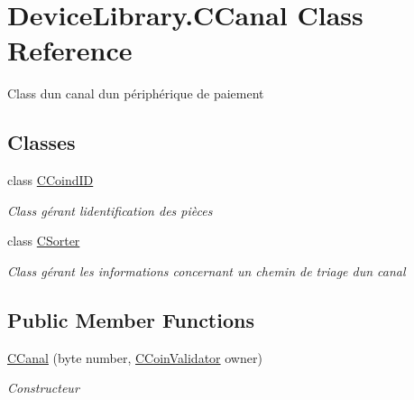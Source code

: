 \hypertarget{class_device_library_1_1_c_canal}{}\section{Device\+Library.\+C\+Canal Class Reference}
\label{class_device_library_1_1_c_canal}


Class d\textquotesingle{}un canal d\textquotesingle{}un périphérique de paiement  


\subsection*{Classes}
\begin{DoxyCompactItemize}
\item 
class \mbox{\hyperlink{class_device_library_1_1_c_canal_1_1_c_coind_i_d}{C\+Coind\+ID}}
\begin{DoxyCompactList}\small\item\em Class gérant l\textquotesingle{}identification des pièces \end{DoxyCompactList}\item 
class \mbox{\hyperlink{class_device_library_1_1_c_canal_1_1_c_sorter}{C\+Sorter}}
\begin{DoxyCompactList}\small\item\em Class gérant les informations concernant un chemin de triage d\textquotesingle{}un canal \end{DoxyCompactList}\end{DoxyCompactItemize}
\subsection*{Public Member Functions}
\begin{DoxyCompactItemize}
\item 
\mbox{\hyperlink{class_device_library_1_1_c_canal_a31af2f08cfb27d40798116fdc0cfb372}{C\+Canal}} (byte number, \mbox{\hyperlink{class_device_library_1_1_c_coin_validator}{C\+Coin\+Validator}} owner)
\begin{DoxyCompactList}\small\item\em Constructeur \end{DoxyCompactList}\end{DoxyCompactItemize}

